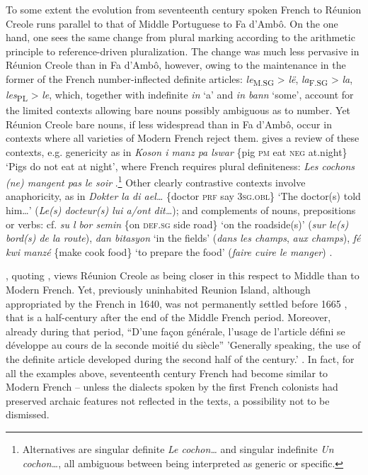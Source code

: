 \documentclass[output=paper]{langscibook}
\begin{document}
To some extent the evolution from seventeenth century spoken French to Réunion Creole runs parallel to that of Middle Portuguese to Fa d’Ambô. On the one hand, one sees the same change from plural marking according to the arithmetic principle to reference-driven pluralization. The change was much less pervasive in Réunion Creole than in Fa d’Ambô, however, owing to the maintenance in the former of the French number-inflected definite articles: \textit{le}\textsubscript{M.SG} > \textit{lë}, \textit{la}\textsubscript{F.SG} > \textit{la}, \textit{les}\textsubscript{PL} > \textit{le}, which, together with indefinite \textit{in} ‘a’ and \textit{in bann} ‘some’, account for the limited contexts allowing bare nouns possibly ambiguous as to number. Yet Réunion Creole bare nouns, if less widespread than in Fa d’Ambô, occur in contexts where all varieties of Modern French reject them. \citet{Chaudenson2007} gives a review of these contexts, e.g. genericity as in \textit{Koson i manz pa lswar} \{pig \textsc{pm} eat \textsc{neg} at.night\} ‘Pigs do not eat at night’, where French  requires plural definiteness: \textit{Les cochons (ne) mangent pas le soir} \citep[230]{Chaudenson2007}.\footnote{Alternatives are singular definite \textit{Le cochon…} and singular indefinite \textit{Un cochon…}, all ambiguous between being interpreted as generic or specific.\label{fn:kihm:35}} Other clearly contrastive contexts involve anaphoricity, as in \textit{Dokter la di ael…} \{doctor \textsc{prf} say \textsc{3sg.obl}\} ‘The doctor(s) told him…’ (\textit{Le(s) docteur(s) lui a/ont dit…}); and complements of nouns, prepositions or verbs: cf. \textit{su l bor semin} \{on \textsc{def.sg} side road\} ‘on the roadside(s)’ (\textit{sur le(s) bord(s) de la route}), \textit{dan bitasyon} ‘in the fields’ (\textit{dans les champs}, \textit{aux champs}), \textit{fé kwi manzé} \{make cook food\} ‘to prepare the food’ (\textit{faire cuire le manger}) \citep[231--234]{Chaudenson2007}.

\citet{Chaudenson2007}, quoting \citet{Valli1994}, views Réunion Creole as being closer in this respect to Middle than to Modern French. Yet, previously uninhabited Reunion Island, although appropriated by the French in 1640, was not permanently settled before 1665 \citep{Bollée2013}, that is a half-century after the end of the Middle French period. Moreover, already during that period, “D’une façon générale, l’usage de l’article défini se développe au cours de la seconde moitié du siècle” 'Generally speaking, the use of the definite article developed during the second half of the century.' \citep[64]{Gougenheim1951}. In fact, for all the examples above, seventeenth century French had become similar to Modern French \citep{Spillebout2000} -- unless the dialects spoken by the first French colonists had preserved archaic features not reflected in the texts, a possibility not to be dismissed.
\end{document}
